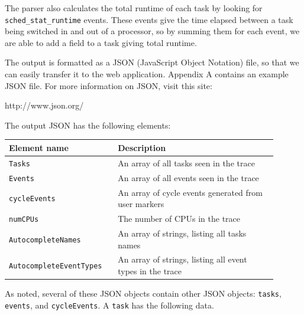 \documentclass{hmcclinic}
\begin{document}
  The parser also calculates the total runtime of each task by looking for
\texttt{sched\_stat\_runtime} events. These events give the time elapsed between
  a task being switched in and out of a processor, so by summing them for 
  each event, we are able to add a field to a task giving total runtime.

  The output is formatted as a JSON (JavaScript Object Notation) file, so that we can easily transfer it to
  the web application. Appendix A contains an example JSON file. For more
  information on JSON, visit this site:

\begin{center}
http://www.json.org/
\end{center}

The output JSON has the following elements:

  \begin{center}
    \begin{tabular}{p{0.35\linewidth}p{0.55\linewidth}}
      \toprule
      \textbf{Element name}        & \textbf{Description}\\
      \midrule
      \texttt{Tasks}      & An array of all tasks seen in the trace\\
       \texttt{Events}     & An array of all events seen in the trace\\
       \texttt{cycleEvents} & An array of cycle events generated from user markers\\
       \texttt{numCPUs}     & The number of CPUs in the trace\\
       \texttt{AutocompleteNames} & An array of strings, listing all tasks names\\
       \texttt{AutocompleteEventTypes} & An array of strings, listing all event types in the trace\\
      \bottomrule
    \end{tabular}
  \end{center}

  As noted, several of these JSON objects contain other JSON objects: \texttt{tasks},
 \texttt{events}, and \texttt{cycleEvents}. A \texttt{task} has the following data.
\end{document}
